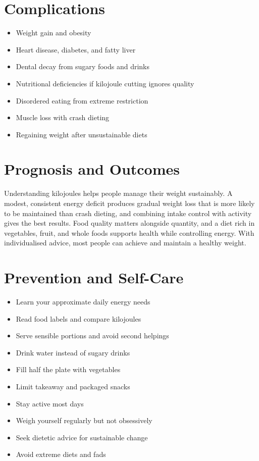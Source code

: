 \section*{Complications}
\begin{itemize}
    \item Weight gain and obesity
    \item Heart disease, diabetes, and fatty liver
    \item Dental decay from sugary foods and drinks
    \item Nutritional deficiencies if kilojoule cutting ignores quality
    \item Disordered eating from extreme restriction
    \item Muscle loss with crash dieting
    \item Regaining weight after unsustainable diets
\end{itemize}

\section*{Prognosis and Outcomes}
Understanding kilojoules helps people manage their weight sustainably. A modest, consistent energy deficit produces gradual weight loss that is more likely to be maintained than crash dieting, and combining intake control with activity gives the best results. Food quality matters alongside quantity, and a diet rich in vegetables, fruit, and whole foods supports health while controlling energy. With individualised advice, most people can achieve and maintain a healthy weight.

\section*{Prevention and Self-Care}
\begin{itemize}
    \item Learn your approximate daily energy needs
    \item Read food labels and compare kilojoules
    \item Serve sensible portions and avoid second helpings
    \item Drink water instead of sugary drinks
    \item Fill half the plate with vegetables
    \item Limit takeaway and packaged snacks
    \item Stay active most days
    \item Weigh yourself regularly but not obsessively
    \item Seek dietetic advice for sustainable change
    \item Avoid extreme diets and fads
\end{itemize}

